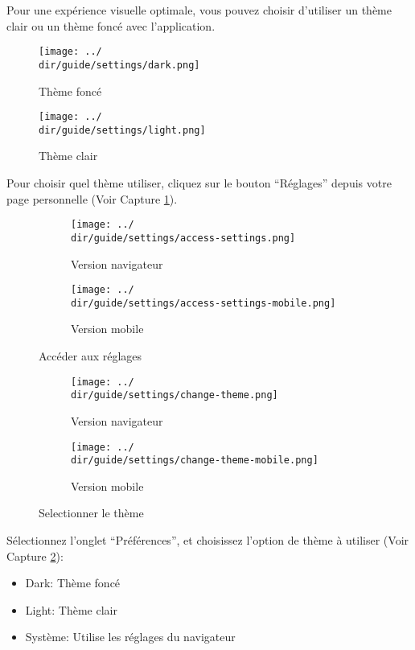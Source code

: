 Pour une expérience visuelle optimale, vous pouvez choisir d’utiliser un thème clair ou un thème foncé avec l’application.

\begin{multicols}{2}
\begin{figure}[H]
	\texttt{[image: ../\\dir/guide/settings/dark.png]}
	\caption{Thème foncé}
\end{figure}
\begin{figure}[H]
	\texttt{[image: ../\\dir/guide/settings/light.png]}
	\caption{Thème clair}
\end{figure}
\end{multicols}

Pour choisir quel thème utiliser, cliquez sur le bouton “Réglages” depuis votre page personnelle (Voir Capture \ref{fig:access-settings-theme}).

\begin{figure}[H]
	\begin{subfigure}[b]{0.7\textwidth}
		\texttt{[image: ../\\dir/guide/settings/access-settings.png]}
		\caption{Version navigateur}
	\end{subfigure}
	\begin{subfigure}[b]{0.25\textwidth}
		\texttt{[image: ../\\dir/guide/settings/access-settings-mobile.png]}
		\caption{Version mobile}
	\end{subfigure}
	\caption{Accéder aux réglages}
	\label{fig:access-settings-theme}
\end{figure}
\begin{figure}[H]
	\begin{subfigure}[b]{0.7\textwidth}
		\texttt{[image: ../\\dir/guide/settings/change-theme.png]}
		\caption{Version navigateur}
	\end{subfigure}
	\begin{subfigure}[b]{0.25\textwidth}
		\texttt{[image: ../\\dir/guide/settings/change-theme-mobile.png]}
		\caption{Version mobile}
	\end{subfigure}
	\caption{Selectionner le thème}
	\label{fig:change-theme}
\end{figure}

Sélectionnez l’onglet “Préférences”, et choisissez l’option de thème à utiliser (Voir Capture \ref{fig:change-theme}):

\begin{itemize}
 	\item Dark: Thème foncé
 	\item Light: Thème clair
 	\item Système: Utilise les réglages du navigateur
\end{itemize}
